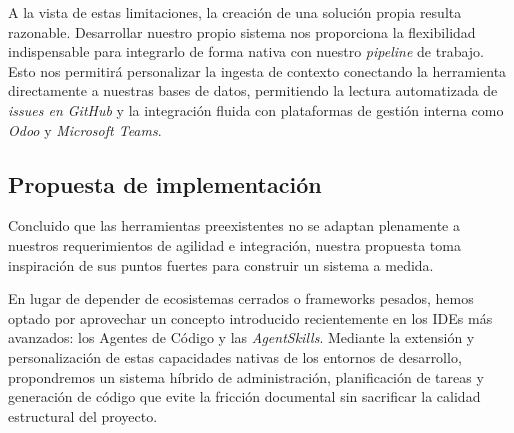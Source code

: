A la vista de estas limitaciones, la creación de una solución propia resulta razonable. Desarrollar nuestro propio sistema nos proporciona la flexibilidad indispensable para integrarlo de forma nativa con nuestro \textit{pipeline} de trabajo. Esto nos permitirá personalizar la ingesta de contexto conectando la herramienta directamente a nuestras bases de datos, permitiendo la lectura automatizada de \textit{issues en GitHub} y la integración fluida con plataformas de gestión interna como \textit{Odoo} y \textit{Microsoft Teams}.

\subsection{Propuesta de implementación}
\label{sec:propuesta_implementacion}

Concluido que las herramientas preexistentes no se adaptan plenamente a nuestros requerimientos de agilidad e integración, nuestra propuesta toma inspiración de sus puntos fuertes para construir un sistema a medida.

En lugar de depender de ecosistemas cerrados o frameworks pesados, hemos optado por aprovechar un concepto introducido recientemente en los IDEs más avanzados: los Agentes de Código \cite{vscode_agents} y las \textit{AgentSkills}\cite{agentskills_home}. Mediante la extensión y personalización de estas capacidades nativas de los entornos de desarrollo, propondremos un sistema híbrido de administración, planificación de tareas y generación de código que evite la fricción documental sin sacrificar la calidad estructural del proyecto.

\newpage
